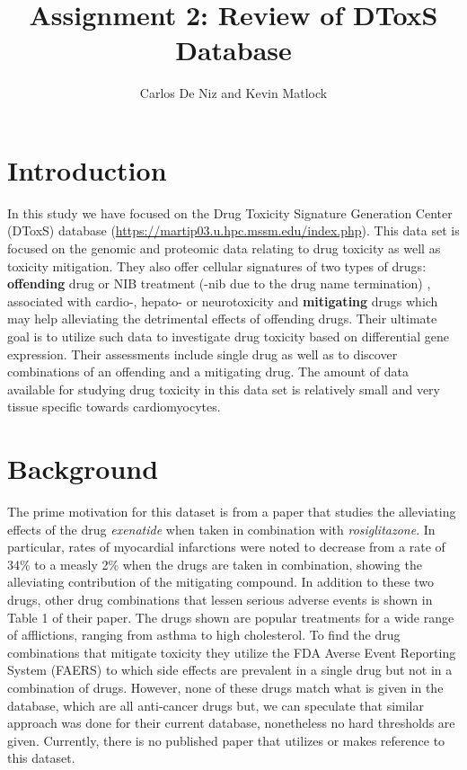 \documentclass[]{article}
\title{Assignment 2: Review of DToxS Database}
\author{Carlos De Niz and Kevin Matlock}
\begin{document}
\date{}
\maketitle

\section{Introduction}
In this study we have focused on the Drug Toxicity Signature Generation Center (DToxS) database (\url{https://martip03.u.hpc.mssm.edu/index.php}). This data set  is focused on the genomic and proteomic data relating to drug toxicity as well as toxicity mitigation. They also offer cellular signatures of two types of drugs: \textbf{offending} drug or NIB treatment (-nib due to the drug name termination) , associated with cardio-, hepato- or neurotoxicity and \textbf{mitigating} drugs which may help alleviating the detrimental effects of offending drugs. Their ultimate goal is to utilize such data to investigate drug toxicity based on differential gene expression. Their assessments include single drug as well as to discover combinations of an offending and a mitigating drug. The amount of data available for studying drug toxicity in this data set is relatively small and very tissue specific towards cardiomyocytes. 

\section{Background}
The prime motivation for this dataset is from a paper that studies the alleviating effects of the drug \emph{exenatide} when taken in combination with \emph{rosiglitazone}\cite{zhao_2013}. 
In particular, rates of myocardial infarctions were noted to decrease from a rate of 34\% to a measly 2\% when the drugs are taken in combination, showing the alleviating contribution of the mitigating compound.
In addition to these two drugs, other drug combinations that lessen serious adverse events is shown in Table 1 of their paper\cite{zhao_2013}. The drugs shown are popular treatments for a wide range of afflictions, ranging from asthma to high cholesterol. 
To find the drug combinations that mitigate toxicity they utilize the FDA Averse Event Reporting System (FAERS) to which side effects are prevalent in a single drug but not in a combination of drugs.
However, none of these drugs match what is given in the database, which are all anti-cancer drugs but, we can speculate that similar approach was done for their current database, nonetheless no hard thresholds are given.
Currently, there is no published paper that utilizes or makes reference to this dataset.
\end{document}
